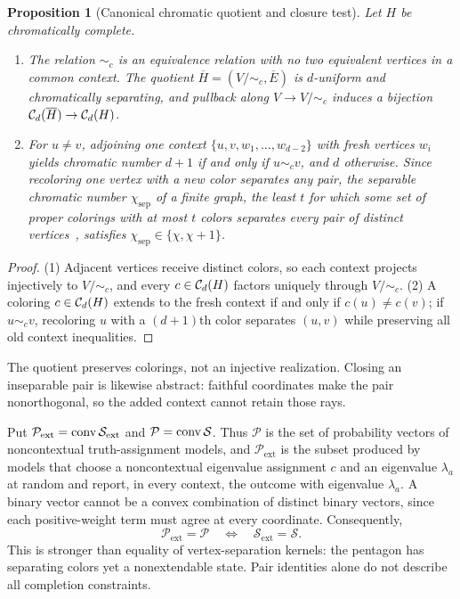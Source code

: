 \documentclass[aps,pra,reprint,superscriptaddress,longbibliography,nofootinbib,floatfix,10pt]{revtex4-2}
\newtheorem{proposition}[theorem]{Proposition}
\theoremstyle{definition}\newtheorem{definition}[theorem]{Definition}
\theoremstyle{remark}\newtheorem{remark}[theorem]{Remark}
\begin{document}
\begin{proposition}[Canonical chromatic quotient and closure test]\label{prop:quotient}\label{prop:closure}
Let $H$ be chromatically complete.
\begin{enumerate}
\item The relation $\sim_c$ is an equivalence relation with no two equivalent vertices in a common context. The quotient $\overline H=(V/{\sim_c},\overline E)$ is $d$-uniform and chromatically separating, and pullback along $V\to V/{\sim_c}$ induces a bijection $\mathcal C_d(\overline H)\to\mathcal C_d(H)$.
\item For $u\ne v$, adjoining one context $\{u,v,w_1,\ldots,w_{d-2}\}$ with fresh vertices $w_i$ yields chromatic number $d+1$ if and only if $u\sim_c v$, and $d$ otherwise. Since recoloring one vertex with a new color separates any pair, the \emph{separable chromatic number} $\chi_{\mathrm{sep}}$ of a finite graph, the least $t$ for which some set of proper colorings with at most $t$ colors separates every pair of distinct vertices~\cite{svozil-2020-c}, satisfies $\chi_{\mathrm{sep}}\in\{\chi,\chi+1\}$.
\end{enumerate}
\end{proposition}
\begin{proof}
(1) Adjacent vertices receive distinct colors, so each context projects injectively to $V/{\sim_c}$, and every $c\in\mathcal C_d(H)$ factors uniquely through $V/{\sim_c}$. (2) A coloring $c\in\mathcal C_d(H)$ extends to the fresh context if and only if $c(u)\ne c(v)$; if $u\sim_c v$, recoloring $u$ with a $(d+1)$th color separates $(u,v)$ while preserving all old context inequalities.
\end{proof}

The quotient preserves colorings, not an injective realization. Closing an inseparable pair is likewise abstract: faithful coordinates make the pair nonorthogonal, so the added context cannot retain those rays.

Put $\mathcal P_{\mathrm{ext}}=\operatorname{conv}\mathcal S_{\mathrm{ext}}$ and $\mathcal P=\operatorname{conv}\mathcal S$. Thus $\mathcal P$ is the set of probability vectors of noncontextual truth-assignment models, and $\mathcal P_{\mathrm{ext}}$ is the subset produced by models that choose a noncontextual eigenvalue assignment $c$ and an eigenvalue $\lambda_a$ at random and report, in every context, the outcome with eigenvalue $\lambda_a$. A binary vector cannot be a convex combination of distinct binary vectors, since each positive-weight term must agree at every coordinate. Consequently,
\begin{equation}\label{eq:polytope-equality}
\mathcal P_{\mathrm{ext}}=\mathcal P\quad\Longleftrightarrow\quad\mathcal S_{\mathrm{ext}}=\mathcal S.
\end{equation}
This is stronger than equality of vertex-separation kernels: the pentagon has separating colors yet a nonextendable state. Pair identities alone do not describe all completion constraints.
\end{document}
